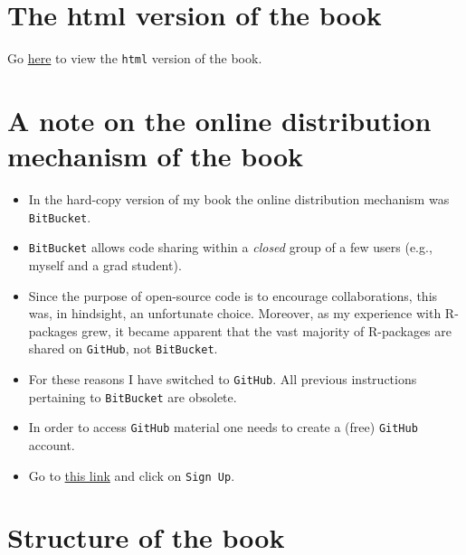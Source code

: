 \documentclass[
]{book}
\providecommand{\tightlist}{%
  \setlength{\itemsep}{0pt}\setlength{\parskip}{0pt}}
\begin{document}
\hypertarget{the-html-version-of-the-book}{%
\section*{The html version of the book}\label{the-html-version-of-the-book}}

Go \href{https://dpc10ster.github.io/RJafrocRocBook/}{here} to view the \texttt{html} version of the book.

\hypertarget{a-note-on-the-online-distribution-mechanism-of-the-book}{%
\section*{A note on the online distribution mechanism of the book}\label{a-note-on-the-online-distribution-mechanism-of-the-book}}

\begin{itemize}
\tightlist
\item
  In the hard-copy version of my book \citep{chakraborty2017observer} the online distribution mechanism was \texttt{BitBucket}.
\item
  \texttt{BitBucket} allows code sharing within a \emph{closed} group of a few users (e.g., myself and a grad student).
\item
  Since the purpose of open-source code is to encourage collaborations, this was, in hindsight, an unfortunate choice. Moreover, as my experience with R-packages grew, it became apparent that the vast majority of R-packages are shared on \texttt{GitHub}, not \texttt{BitBucket}.
\item
  For these reasons I have switched to \texttt{GitHub}. All previous instructions pertaining to \texttt{BitBucket} are obsolete.
\item
  In order to access \texttt{GitHub} material one needs to create a (free) \texttt{GitHub} account.
\item
  Go to \href{https://github.com}{this link} and click on \texttt{Sign\ Up}.
\end{itemize}

\hypertarget{structure-of-the-book}{%
\section*{Structure of the book}\label{structure-of-the-book}}
\end{document}
